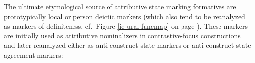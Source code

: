 The ultimate etymological source of attributive state marking formatives are prototypically local or person deictic markers (which also tend to be reanalyzed as markers of definiteness, cf.~Figure \ref{ie-ural funcmap} on page \pageref{ie-ural funcmap}). These markers are initially used as attributive nominalizers in contrastive-focus constructions and later reanalyzed either as anti-construct state markers or anti-construct state agreement markers:

